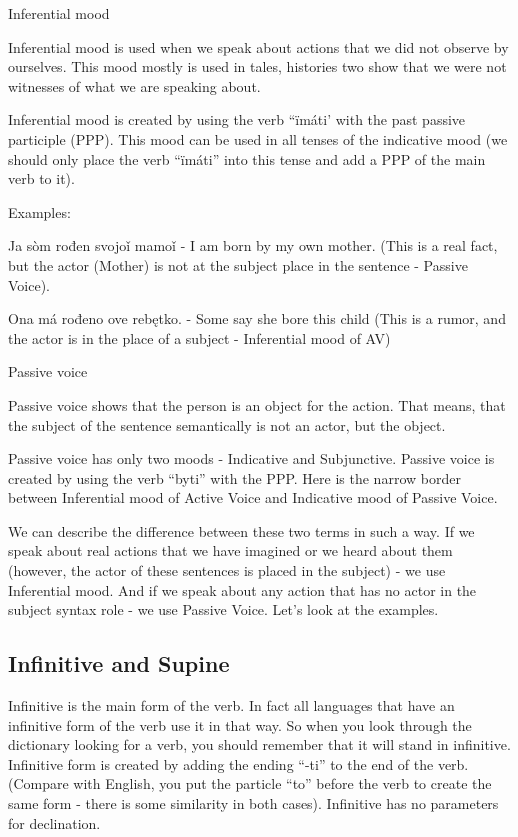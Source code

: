 Inferential mood

Inferential mood is used when we speak about actions that we did not observe by ourselves. This mood mostly is used in tales, histories two show that we were not witnesses of what we are speaking about.

Inferential mood is created by using the verb “ïmáti’ with the past passive participle (PPP). This mood can be used in all tenses of the indicative mood (we should only place the verb “ïmáti” into this tense and add a PPP of the main verb to it). 

Examples:

Ja sòm rođen svojoǐ mamoǐ - I am born by my own mother. (This is a real fact, but the actor (Mother) is not at the subject place in the sentence - Passive Voice).

Ona má rođeno ove rebętko. - Some say she bore this child (This is a rumor, and the actor is in the place of a subject - Inferential mood of AV)

Passive voice

Passive voice shows that the person is an object for the action. That means, that the subject of the sentence semantically is not an actor, but the object. 

Passive voice has only two moods - Indicative and Subjunctive. Passive voice is created by using the verb “byti” with the PPP. Here is the narrow border between Inferential mood of Active Voice and Indicative mood of Passive Voice.

We can describe the difference between these two terms in such a way. If we speak about real actions that we have imagined or we heard about them (however, the actor of these sentences is placed in the subject) - we use Inferential mood. And if we speak about any action that has no actor in the subject syntax role - we use Passive Voice. Let’s look at the examples.




\subsection{Infinitive and Supine}

Infinitive is the main form of the verb. In fact all languages that have an infinitive form of the verb use it in that way. So when you look through the dictionary looking for a verb, you should remember that it will stand in infinitive. Infinitive form is created by adding the ending “-ti” to the end of the verb. (Compare with English, you put the particle “to” before the verb to create the same form - there is some similarity in both cases). Infinitive has no parameters for declination.

